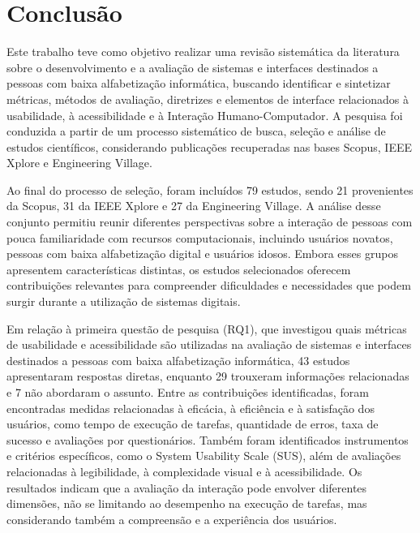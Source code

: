 \chapter{Conclusão}

Este trabalho teve como objetivo realizar uma revisão sistemática da literatura sobre o desenvolvimento e a avaliação de sistemas e interfaces destinados a pessoas com baixa alfabetização informática, buscando identificar e sintetizar métricas, métodos de avaliação, diretrizes e elementos de interface relacionados à usabilidade, à acessibilidade e à Interação Humano-Computador. A pesquisa foi conduzida a partir de um processo sistemático de busca, seleção e análise de estudos científicos, considerando publicações recuperadas nas bases Scopus, IEEE Xplore e Engineering Village.

Ao final do processo de seleção, foram incluídos 79 estudos, sendo 21 provenientes da Scopus, 31 da IEEE Xplore e 27 da Engineering Village. A análise desse conjunto permitiu reunir diferentes perspectivas sobre a interação de pessoas com pouca familiaridade com recursos computacionais, incluindo usuários novatos, pessoas com baixa alfabetização digital e usuários idosos. Embora esses grupos apresentem características distintas, os estudos selecionados oferecem contribuições relevantes para compreender dificuldades e necessidades que podem surgir durante a utilização de sistemas digitais.

Em relação à primeira questão de pesquisa (RQ1), que investigou quais métricas de usabilidade e acessibilidade são utilizadas na avaliação de sistemas e interfaces destinados a pessoas com baixa alfabetização informática, 43 estudos apresentaram respostas diretas, enquanto 29 trouxeram informações relacionadas e 7 não abordaram o assunto. Entre as contribuições identificadas, foram encontradas medidas relacionadas à eficácia, à eficiência e à satisfação dos usuários, como tempo de execução de tarefas, quantidade de erros, taxa de sucesso e avaliações por questionários. Também foram identificados instrumentos e critérios específicos, como o System Usability Scale (SUS), além de avaliações relacionadas à legibilidade, à complexidade visual e à acessibilidade. Os resultados indicam que a avaliação da interação pode envolver diferentes dimensões, não se limitando ao desempenho na execução de tarefas, mas considerando também a compreensão e a experiência dos usuários.

